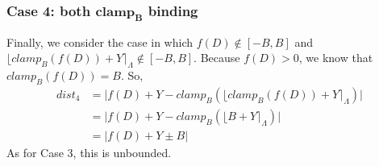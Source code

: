 \documentclass[11pt]{scrartcl} %
\begin{document}
\subsubsection{Case 4: both $\boldsymbol{clamp_B}$ binding}
Finally, we consider the case in which $f(D) \not\in [-B,B]$ and $\lfloor clamp_{B}\left( f(D) \right) + Y \rceil_{\Lambda} \not\in [-B, B]$. Because $f(D) > 0$, we know that $clamp_{B} \left( f(D) \right) = B$. So,
\begin{align}
	dist_4 &= \big\vert f(D) + Y - clamp_{B} \left( \lfloor clamp_{B} \left( f(D) \right)  + Y \rceil_{\Lambda} \right) \big\vert \nonumber \\
		   &= \big\vert f(D) + Y - clamp_{B} \left( \lfloor B + Y \rceil_{\Lambda} \right) \big\vert \nonumber \\
		   &= \big\vert f(D) + Y \pm B \big\vert \nonumber
\end{align}
As for Case 3, this is unbounded.

%
%
\end{document}
